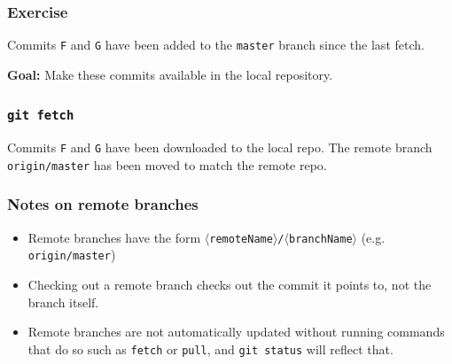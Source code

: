 \documentclass{beamer}
\newcommand\gitcmd[1]{\texttt{git #1}}
\newcommand\gitsubcmd[1]{\texttt{#1}}
\newcommand\grefspec[1]{\texttt{#1}}
\newcommand\gbranch[1]{\texttt{#1}}
\newcommand\gremotebranch[1]{\texttt{#1}}
\newcommand\goal[1]{\textbf{Goal:} #1}
\begin{document}
\begin{frame}
  \frametitle{Exercise}

  Commits \grefspec{F} and \grefspec{G} have been added to the \gbranch{master} branch since the last fetch.

  \goal{Make these commits available in the local repository.}

  \begin{figure}
    \centering
  \end{figure}
\end{frame}

\begin{frame}
  \frametitle{\gitcmd{fetch}}

  \begin{figure}
    \centering
  \end{figure}

  Commits \grefspec{F} and \grefspec{G} have been downloaded to the local repo. The remote branch \gremotebranch{origin/master} has been moved to match the remote repo.
\end{frame}

\begin{frame}
  \frametitle{Notes on remote branches}
  \begin{itemize}
    \item Remote branches have the form \gremotebranch{$\langle$remoteName$\rangle$/$\langle$branchName$\rangle$} (e.g. \gremotebranch{origin/master})
    \item Checking out a remote branch checks out the commit it points to, not the branch itself.
    \item Remote branches are not automatically updated without running commands that do so such as \gitsubcmd{fetch} or \gitsubcmd{pull}, and \gitcmd{status} will reflect that.
  \end{itemize}
\end{frame}
\end{document}
